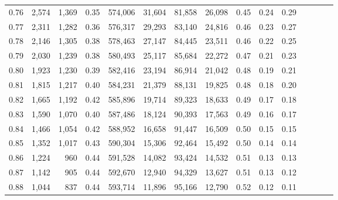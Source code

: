 \begin{tabular}{rrrcrrrrrrrrrrr}
0.76 &   2,574 &  1,369 &                                       0.35 &  574,006 &   31,604 &   81,858 &   26,098 &  0.45 &  0.24 &                         0.29 \\
0.77 &   2,311 &  1,282 &                                       0.36 &  576,317 &   29,293 &   83,140 &   24,816 &  0.46 &  0.23 &                         0.27 \\
0.78 &   2,146 &  1,305 &                                       0.38 &  578,463 &   27,147 &   84,445 &   23,511 &  0.46 &  0.22 &                         0.25 \\
0.79 &   2,030 &  1,239 &                                       0.38 &  580,493 &   25,117 &   85,684 &   22,272 &  0.47 &  0.21 &                         0.23 \\
0.80 &   1,923 &  1,230 &                                       0.39 &  582,416 &   23,194 &   86,914 &   21,042 &  0.48 &  0.19 &                         0.21 \\
0.81 &   1,815 &  1,217 &                                       0.40 &  584,231 &   21,379 &   88,131 &   19,825 &  0.48 &  0.18 &                         0.20 \\
0.82 &   1,665 &  1,192 &                                       0.42 &  585,896 &   19,714 &   89,323 &   18,633 &  0.49 &  0.17 &                         0.18 \\
0.83 &   1,590 &  1,070 &                                       0.40 &  587,486 &   18,124 &   90,393 &   17,563 &  0.49 &  0.16 &                         0.17 \\
0.84 &   1,466 &  1,054 &                                       0.42 &  588,952 &   16,658 &   91,447 &   16,509 &  0.50 &  0.15 &                         0.15 \\
0.85 &   1,352 &  1,017 &                                       0.43 &  590,304 &   15,306 &   92,464 &   15,492 &  0.50 &  0.14 &                         0.14 \\
0.86 &   1,224 &    960 &                                       0.44 &  591,528 &   14,082 &   93,424 &   14,532 &  0.51 &  0.13 &                         0.13 \\
0.87 &   1,142 &    905 &                                       0.44 &  592,670 &   12,940 &   94,329 &   13,627 &  0.51 &  0.13 &                         0.12 \\
0.88 &   1,044 &    837 &                                       0.44 &  593,714 &   11,896 &   95,166 &   12,790 &  0.52 &  0.12 &                         0.11 \\

\end{tabular}
